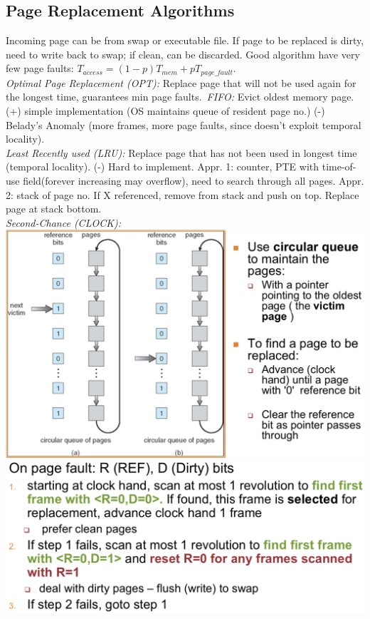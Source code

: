 \subsection*{Page Replacement Algorithms}
Incoming page can be from swap or executable file. If page to be replaced is dirty, need to write back to swap; if clean, can be discarded. Good algorithm have very few page faults: $T_{access}=(1-p)T_{mem}+pT_{page\_fault}$.\\
\emph{Optimal Page Replacement (OPT):} Replace page that will not be used again for the longest time, guarantees min page faults.\
\emph{FIFO:} Evict oldest memory page. (+) simple implementation (OS maintains queue of resident page no.) (-) Belady's Anomaly (more frames, more page faults, since doesn't exploit temporal locality).\\
\emph{Least Recently used (LRU):} Replace page that has not been used in longest time (temporal locality). (-) Hard to implement. Appr. 1: counter, PTE with time-of-use field(forever increasing may overflow), need to search through all pages. Appr. 2: stack of page no. If X referenced, remove from stack and push on top. Replace page at stack bottom.\\
\emph{Second-Chance (CLOCK):}\\
\includegraphics[width=0.8\linewidth]{images/second-chance-page-replacement}\\
\includegraphics[width=0.9\linewidth]{images/clock_algo}

